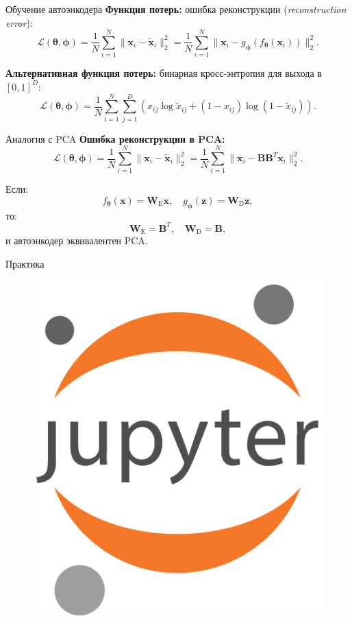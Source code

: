 \begin{frame}{Обучение автоэнкодера}
    \textbf{Функция потерь:} ошибка реконструкции (\textit{reconstruction error}):
    \begin{equation*}
        \mathcal{L}(\boldsymbol{\theta}, \boldsymbol{\phi}) = \frac{1}{N}\sum_{i=1}^N\|\boldsymbol{x}_i - \tilde{\boldsymbol{x}}_i\|^2_2 = \frac{1}{N}\sum_{i=1}^N\|\boldsymbol{x}_i - g_{\boldsymbol{\phi}}(f_{\boldsymbol{\theta}}(\boldsymbol{x}_i))\|^2_2.
    \end{equation*}

    \textbf{Альтернативная функция потерь:} бинарная кросс-энтропия для выхода в $[0, 1]^D$:
    \begin{equation*}
        \mathcal{L}(\boldsymbol{\theta}, \boldsymbol{\phi}) = \frac{1}{N}\sum_{i=1}^N\sum_{j=1}^D\left(x_{ij}\log\tilde{x}_{ij} + (1 - x_{ij})\log(1 - \tilde{x}_{ij})\right).
    \end{equation*}
\end{frame}

\begin{frame}{Аналогия с PCA}
    \textbf{Ошибка реконструкции в PCA:}
    \begin{equation*}
        \mathcal{L}(\boldsymbol{\theta}, \boldsymbol{\phi}) = \frac{1}{N}\sum_{i=1}^N\|\boldsymbol{x}_i - \tilde{\boldsymbol{x}}_i\|^2_2 = \frac{1}{N}\sum_{i=1}^N\|\boldsymbol{x}_i - \mathbf{B}\mathbf{B}^T\boldsymbol{x}_i\|^2_2.
    \end{equation*}

    Если:
    \begin{equation*}
        f_{\boldsymbol{\theta}}(\boldsymbol{x}) = \mathbf{W}_{\text{E}}\boldsymbol{x}, \quad g_{\boldsymbol{\phi}}(\boldsymbol{z}) = \mathbf{W}_{\text{D}}\boldsymbol{z},
    \end{equation*}
    то:
    \begin{equation*}
        \mathbf{W}_{\text{E}} = \mathbf{B}^T, \quad \mathbf{W}_{\text{D}} = \mathbf{B},
    \end{equation*}
    и автоэнкодер эквивалентен PCA.
\end{frame}

\begin{frame}{Практика}
    \begin{figure}
        \centering
        \includegraphics[width=.3\textwidth]{../resources/overall/Jupyter_logo.png}
    \end{figure}
\end{frame}